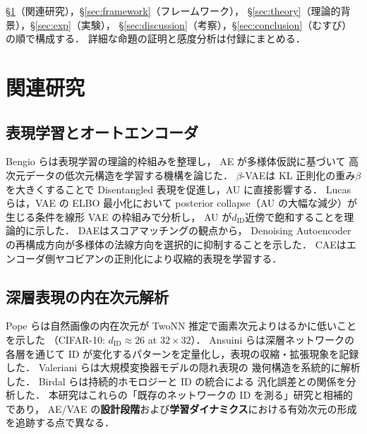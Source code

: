 \documentclass[11pt,a4paper]{jsarticle}
\begin{document}
§\ref{sec:related}（関連研究），§\ref{sec:framework}（フレームワーク），
§\ref{sec:theory}（理論的背景），§\ref{sec:exp}（実験），
§\ref{sec:discussion}（考察），§\ref{sec:conclusion}（むすび）の順で構成する．
詳細な命題の証明と感度分析は付録にまとめる．

\section{関連研究}\label{sec:related}

\subsection{表現学習とオートエンコーダ}\label{sec:related_ae}

Bengio ら\cite{bengio2013representation}は表現学習の理論的枠組みを整理し，
AE が多様体仮説\cite{fefferman2016manifold}に基づいて
高次元データの低次元構造を学習する機構を論じた．
$\beta$-VAE\cite{higgins2017betavae}は KL 正則化の重み$\beta$を大きくすることで
Disentangled 表現を促進し，AU に直接影響する．
Lucas ら\cite{lucas2019elbo}は，VAE の ELBO 最小化において
posterior collapse（AU の大幅な減少）が生じる条件を線形 VAE の枠組みで分析し，
AU が$d_{\mathrm{ID}}$近傍で飽和することを理論的に示した．
DAE\cite{alain2014dae}はスコアマッチングの観点から，
Denoising Autoencoder の再構成方向が多様体の法線方向を選択的に抑制することを示した．
CAE\cite{rifai2011cae}はエンコーダ側ヤコビアンの正則化により収縮的表現を学習する．

\subsection{深層表現の内在次元解析}\label{sec:related_id}

Pope ら\cite{pope2021intrinsic}は自然画像の内在次元が
TwoNN 推定で画素次元よりはるかに低いことを示した
（CIFAR-10: $d_\mathrm{ID} \approx 26$ at $32 \times 32$）．
Ansuini ら\cite{ansuini2019intrinsic}は深層ネットワークの各層を通じて
ID が変化するパターンを定量化し，表現の収縮・拡張現象を記録した．
Valeriani ら\cite{valeriani2023geometry}は大規模変換器モデルの隠れ表現の
幾何構造を系統的に解析した．
Birdal ら\cite{birdal2021intrinsic}は持続的ホモロジーと ID の統合による
汎化誤差との関係を分析した．
本研究はこれらの「既存のネットワークの ID を測る」研究と相補的であり，
AE/VAE の\textbf{設計段階}および\textbf{学習ダイナミクス}における有効次元の形成を追跡する点で異なる．
\end{document}
